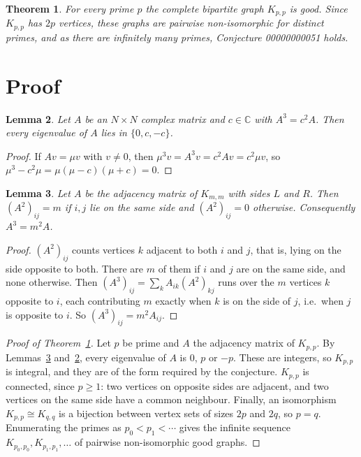\documentclass[11pt]{article}
\theoremstyle{plain}
\newtheorem{theorem}{Theorem}
\newtheorem{lemma}[theorem]{Lemma}
\theoremstyle{definition}
\theoremstyle{remark}
\begin{document}
\begin{theorem}\label{thm:main}
For every prime $p$ the complete bipartite graph $K_{p,p}$ is good. Since
$K_{p,p}$ has $2p$ vertices, these graphs are pairwise non-isomorphic for
distinct primes, and as there are infinitely many primes, Conjecture
00000000051 holds.
\end{theorem}

\section{Proof}

\begin{lemma}\label{lem:cube}
Let $A$ be an $N\times N$ complex matrix and $c\in\mathbb C$ with $A^3=c^2A$.
Then every eigenvalue of $A$ lies in $\{0,c,-c\}$.
\end{lemma}

\begin{proof}
If $Av=\mu v$ with $v\ne0$, then $\mu^3v=A^3v=c^2Av=c^2\mu v$, so
$\mu^3-c^2\mu=\mu(\mu-c)(\mu+c)=0$.
\end{proof}

\begin{lemma}\label{lem:walks}
Let $A$ be the adjacency matrix of $K_{m,m}$ with sides $L$ and $R$. Then
$(A^2)_{ij}=m$ if $i,j$ lie on the same side and $(A^2)_{ij}=0$ otherwise.
Consequently $A^3=m^2A$.
\end{lemma}

\begin{proof}
$(A^2)_{ij}$ counts vertices $k$ adjacent to both $i$ and $j$, that is, lying on
the side opposite to both. There are $m$ of them if $i$ and $j$ are on the same
side, and none otherwise. Then
$(A^3)_{ij}=\sum_k A_{ik}(A^2)_{kj}$ runs over the $m$ vertices $k$ opposite to
$i$, each contributing $m$ exactly when $k$ is on the side of $j$, i.e.\ when
$j$ is opposite to $i$. So $(A^3)_{ij}=m^2A_{ij}$.
\end{proof}

\begin{proof}[Proof of Theorem~\ref{thm:main}]
Let $p$ be prime and $A$ the adjacency matrix of $K_{p,p}$. By
Lemmas~\ref{lem:walks} and~\ref{lem:cube}, every eigenvalue of $A$ is $0$, $p$
or $-p$. These are integers, so $K_{p,p}$ is integral, and they are of the form
required by the conjecture. $K_{p,p}$ is connected, since $p\ge1$: two vertices
on opposite sides are adjacent, and two vertices on the same side have a common
neighbour. Finally, an isomorphism $K_{p,p}\cong K_{q,q}$ is a bijection
between vertex sets of sizes $2p$ and $2q$, so $p=q$. Enumerating the primes as
$p_0<p_1<\cdots$ gives the infinite sequence $K_{p_0,p_0},K_{p_1,p_1},\ldots$
of pairwise non-isomorphic good graphs.
\end{proof}
\end{document}
